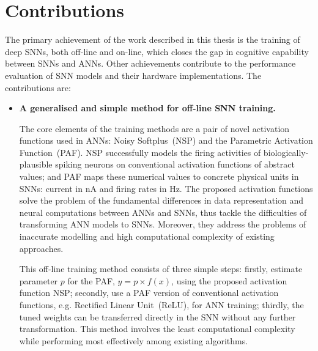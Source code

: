 \section{Contributions}
The primary achievement of the work described in this thesis is the training of deep SNNs, both off-line and on-line, which closes the gap in cognitive capability between SNNs and ANNs.
Other achievements contribute to the performance evaluation of SNN models and their hardware implementations.
The contributions are:
\begin{itemize}
%	
	
	\item 
	\textbf{A generalised and simple method for off-line SNN training.}
	
	The core elements of the training methods are a pair of novel activation functions used in ANNs: Noisy Softplus~(NSP) and the Parametric Activation Function~(PAF).
	NSP successfully models the firing activities of biologically-plausible spiking neurons on conventional activation functions of abstract values;
	and PAF maps these numerical values to concrete physical units in SNNs: current in nA and firing rates in Hz.
	The proposed activation functions solve the problem of the fundamental differences in data representation and neural computations between ANNs and SNNs, thus tackle the difficulties of transforming ANN models to SNNs.
	Moreover, they address the problems of inaccurate modelling and high computational complexity of existing approaches.
	
	This off-line training method consists of three simple steps: firstly, estimate parameter $p$ for the PAF, $y = p \times f(x)$, using the proposed activation function NSP; secondly, use a PAF version of conventional activation functions, e.g. Rectified Linear Unit~(ReLU), for ANN training; %
	thirdly, the tuned weights can be transferred directly in the SNN without any further transformation.
	This method involves the least computational complexity while performing most effectively among existing algorithms.


\end{itemize}
